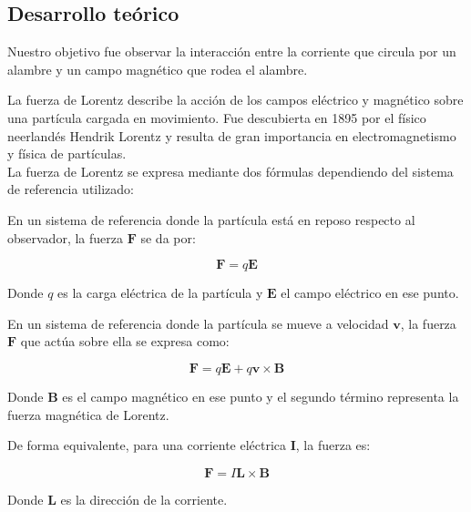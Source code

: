 \documentclass{article}
\begin{document}

\begin{multicols}{2}
\section{Desarrollo teórico}\label{Desarrollo Teorico}                              	%
Nuestro objetivo fue observar la interacción entre la corriente
 que circula por un alambre y un campo
magnético que rodea el alambre.
\cite{Fernandez}

La fuerza de Lorentz describe la acción de los campos eléctrico y magnético sobre una partícula cargada en movimiento. Fue descubierta en 1895 por el físico neerlandés Hendrik Lorentz y resulta de gran importancia en electromagnetismo y física de partículas.\\

La fuerza de Lorentz se expresa mediante dos fórmulas dependiendo del sistema de referencia utilizado:

En un sistema de referencia donde la partícula está en reposo respecto al observador, la fuerza $\mathbf{F}$ se da por:

\begin{equation}
\mathbf{F} = q\mathbf{E}
\end{equation}

Donde $q$ es la carga eléctrica de la partícula y $\mathbf{E}$ el campo eléctrico en ese punto.

En un sistema de referencia donde la partícula se mueve a velocidad $\mathbf{v}$, la fuerza $\mathbf{F}$ que actúa sobre ella se expresa como:

\begin{equation}
\mathbf{F} = q\mathbf{E}+q\mathbf{v}\times\mathbf{B}
\end{equation}

Donde $\mathbf{B}$ es el campo magnético en ese punto y el segundo término representa la fuerza magnética de Lorentz.

De forma equivalente, para una corriente eléctrica $\mathbf{I}$, la fuerza es:

\begin{equation}
\mathbf{F}= I\mathbf{L}\times\mathbf{B}
\end{equation}

Donde $\mathbf{L}$ es la dirección de la corriente.



\end{multicols}
\end{document}
